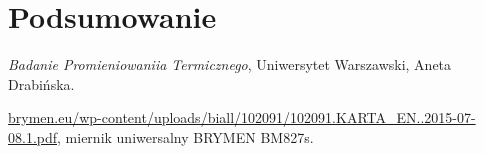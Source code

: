 \documentclass[12pt]{article}
\begin{document}
\section{Podsumowanie}



\newpage

\begin{thebibliography}{1}

\emph{Badanie Promieniowaniia Termicznego}, Uniwersytet Warszawski, Aneta Drabińska.

\url{brymen.eu/wp-content/uploads/biall/102091/102091.KARTA_EN..2015-07-08.1.pdf}, miernik uniwersalny BRYMEN BM827s.
\end{thebibliography}
\end{document}

